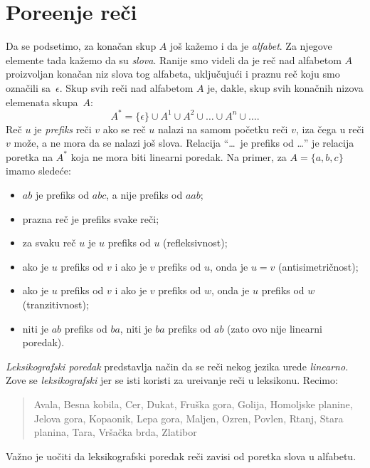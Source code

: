 \section{Pore\dj enje re\v ci}

Da se podsetimo, za kona\v can skup $A$ jo\v s ka\v zemo i da je \emph{alfabet}.
Za njegove elemente tada ka\v zemo da su \emph{slova}.
Ranije smo videli da je re\v c nad alfabetom $A$ proizvoljan kona\v can niz slova tog alfabeta,
uklju\v cuju\'ci i praznu re\v c koju smo ozna\v cili sa~$\epsilon$.
Skup svih re\v ci nad alfabetom $A$ je, dakle, skup svih kona\v cnih nizova elemenata skupa~$A$:
$$
  A^* = \{\epsilon\} \cup A^1 \cup A^2 \cup \ldots \cup A^n \cup \ldots.
$$
Re\v c $u$ je \emph{prefiks} re\v ci $v$ ako se re\v c $u$ nalazi na samom po\v cetku re\v ci $v$, iza \v cega u re\v ci
$v$ mo\v ze, a ne mora da se nalazi jo\v s slova. Relacija \enquote{\ldots\ je prefiks od \ldots} je relacija poretka
na $A^*$ koja ne mora biti linearni poredak. Na primer, za $A = \{a, b, c\}$ imamo slede\'ce:
\begin{itemize}\itemsep -1.5pt
\item
  $ab$ je prefiks od $abc$, a nije prefiks od $aab$;
\item
  prazna re\v c je prefiks svake re\v ci;
\item
  za svaku re\v c $u$ je $u$ prefiks od $u$ (refleksivnost);
\item
  ako je $u$ prefiks od $v$ i ako je $v$ prefiks od $u$, onda je $u = v$ (antisimetri\v cnost);
\item
  ako je $u$ prefiks od $v$ i ako je $v$ prefiks od $w$, onda je $u$ prefiks od $w$ (tranzitivnost);
\item
  niti je $ab$ prefiks od $ba$, niti je $ba$ prefiks od $ab$ (zato ovo nije linearni poredak).
\end{itemize}

\emph{Leksikografski poredak} predstavlja na\v cin da se re\v ci nekog jezika urede \emph{linearno.}
Zove se \emph{leksikografski} jer se isti koristi za ure\dj ivanje re\v ci u leksikonu.
Recimo:
\begin{quote}
  Avala,
  Besna kobila,
  Cer,
  Dukat,
  Fruška gora,
  Golija,
  Homoljske planine,
  Jelova gora,
  Kopaonik,
  Lepa gora,
  Maljen,
  Ozren,
  Povlen,
  Rtanj,
  Stara planina,
  Tara,
  Vršačka brda,
  Zlatibor
\end{quote}
Va\v zno je uo\v citi da leksikografski poredak re\v ci zavisi od poretka slova u alfabetu.


